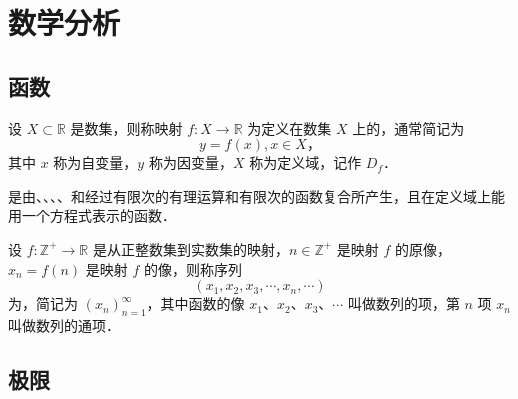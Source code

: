 \chapter{数学分析}

\section{函数}

\begin{Definition}[\textbf{函数}]\label{Definition:Function}
    设 $ X \subset \mathbb{R} $ 是数集，则称映射 $ f: X \to \mathbb{R} $ 为定义在数集 $X$ 上的，通常简记为
    \[ y = f(x), x \in X \text{，} \]
    其中 $x$ 称为自变量，$y$ 称为因变量，$X$ 称为定义域，记作 $D_f$．
\end{Definition}

\begin{Definition}\label{Definition:ElementaryFunction}
    是由、、、、和经过有限次的有理运算和有限次的函数复合所产生，且在定义域上能用一个方程式表示的函数．
\end{Definition}

\begin{Definition}[\textbf{数列}]\label{Definition:NumberSequence}
    设 $ f: \mathbb{Z}^+ \to \mathbb{R} $ 是从正整数集到实数集的映射，$ n \in \mathbb{Z}^+ $ 是映射 $f$ 的原像，$ x_n = f(n) $ 是映射 $f$ 的像，则称序列
    \[ ( x_1, x_2, x_3, \cdots, x_n, \cdots ) \]
    为，简记为 $(x_n)_{n=1}^{\infty}$，其中函数的像 $x_1$、$x_2$、$x_3$、$\cdots$ 叫做数列的项，第 $n$ 项 $x_n$ 叫做数列的通项．
\end{Definition}

\section{极限}

